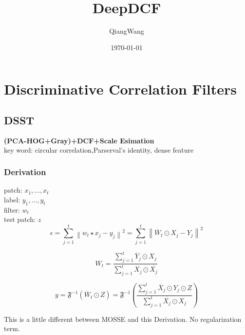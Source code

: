 \documentclass[11pt]{article}
\begin{document}
\title{DeepDCF}
\author{QiangWang}
\date{\today}
\maketitle

\section{Discriminative Correlation Filters}
	\subsection{DSST}
	\textbf{(PCA-HOG+Gray)+DCF+Scale Esimation}\\
	key word: circular correlation,Parserval's identity, dense feature
		\subsubsection{Derivation}
		patch: $x_1,...,x_t$	\\
		label: $y_1,...,y_t$	\\
		filter: $w_t$	\\
		test patch: $z$	\\

$$
\epsilon =  \sum_{j=1}^{t}\left \| w_{t}\star x_{j}-y_{j} \right \|^{2} = \sum_{j=1}^{t}\left \| \overline{W}_{t} \odot X_{j}-Y_{j} \right \|^{2}
$$


$$
W_{t}=\frac{\sum_{j=1}^{t}\overline{Y}_{j} \odot X_{j}}{\sum_{j=1}^{t}X_{j} \odot\overline{ X_{j}}} 
$$

$$
y=\mathfrak{F}^{-1} \left( {\overline{W}_{t} \odot Z}\right)
 = \mathfrak{F}^{-1} \left(\frac{\sum_{j=1}^{t}\overline{X}_{j} \odot Y_{j} \odot Z}{\sum_{j=1}^{t}\overline{X_{j}} \odot X_{j}} \right)
$$

This is a little different between MOSSE\cite{MOSSE} and this Derivation. No regularization term.
		


\pagebreak		


\end{document}
